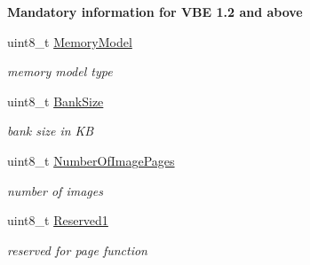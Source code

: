 \begin{Indent}{\bf Mandatory information for V\+BE 1.2 and above}
\begin{DoxyCompactItemize}
uint8\+\_\+t \hyperlink{structvbe__mode__info__t_ab9be703b2b515ba3428ed97af9bb084d}{Memory\+Model}
\begin{DoxyCompactList}\small\item\em memory model type \end{DoxyCompactList}\item 
uint8\+\_\+t \hyperlink{structvbe__mode__info__t_a7e31ea09e6e6755e3a504b9c76b3f545}{Bank\+Size}
\begin{DoxyCompactList}\small\item\em bank size in KB \end{DoxyCompactList}\item 
uint8\+\_\+t \hyperlink{structvbe__mode__info__t_a7033bb4cac6dc49f68ca4df855151e09}{Number\+Of\+Image\+Pages}
\begin{DoxyCompactList}\small\item\em number of images \end{DoxyCompactList}\item 
uint8\+\_\+t \hyperlink{structvbe__mode__info__t_a604037992fe7e5fd08e1bcc684a1b12d}{Reserved1}
\begin{DoxyCompactList}\small\item\em reserved for page function \end{DoxyCompactList}\end{DoxyCompactItemize}
\end{Indent}
